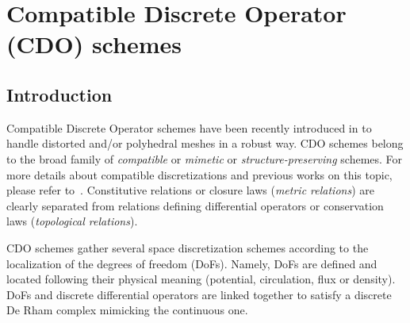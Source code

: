 \section{Compatible Discrete Operator (CDO) schemes}

\subsection{Introduction }

Compatible Discrete Operator schemes have been recently introduced in \CS to
handle distorted and/or polyhedral meshes in a robust way. CDO schemes belong to
the broad family of \emph{compatible} or \emph{mimetic} or
\emph{structure-preserving} schemes. For more details about compatible
discretizations and previous works on this topic, please refer
to~\cite[Chapter~2 - Compatible spatial discretization]{Bonel14}. Constitutive
relations or closure laws (\emph{metric relations}) are clearly separated from
relations defining differential operators or conservation laws
(\emph{topological relations}).

CDO schemes gather several space discretization schemes according to the
localization of the degrees of freedom (DoFs). Namely, DoFs are defined and
located following their physical meaning (potential, circulation, flux or
density). DoFs and discrete differential operators are linked together to
satisfy a discrete De Rham complex mimicking the continuous one.


